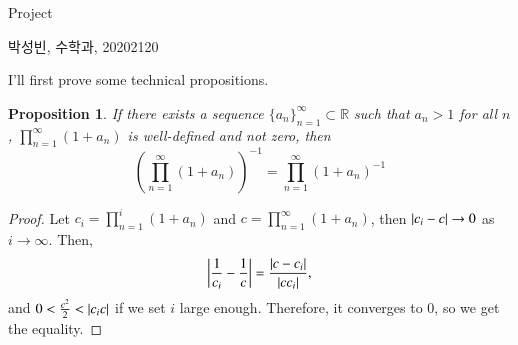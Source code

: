 \documentclass[a4paper, 12pt]{article}
\theoremstyle{Mydefinition}
\theoremstyle{Mytheorem}
\newtheorem{proposition}[statement]{Proposition}
\begin{document}
\thispagestyle{myfirstpage}
\begin{center}
	\Large{Project}
\end{center}
박성빈, 수학과, 20202120

I'll first prove some technical propositions.
\begin{proposition}\label{Prop:Inverse}
If there exists a sequence $\{a_n\}_{n=1}^\infty\subset \mathbb{R}$ such that $a_n>1$ for all $n$, $\prod_{n=1}^\infty (1+a_n)$ is well-defined and not zero, then
\begin{equation*}
    \left(\prod_{n=1}^\infty (1+a_n)\right)^{-1} = \prod_{n=1}^\infty (1+a_n)^{-1}
\end{equation*}
\end{proposition}
\begin{proof}
Let $c_i = \prod_{n=1}^i (1+a_n)$ and $c = \prod_{n=1}^\infty (1+a_n)$, then $\abs{c_i-c}\rightarrow 0$ as $i\rightarrow \infty$. Then,
\begin{equation*}
    \abs{\frac{1}{c_i}-\frac{1}{c}} = \frac{\abs{c-c_i}}{\abs{cc_i}},
\end{equation*}
and $0<\frac{c^2}{2}<\abs{c_i c}$ if we set $i$ large enough. Therefore, it converges to $0$, so we get the equality.
\end{proof}
\end{document}
